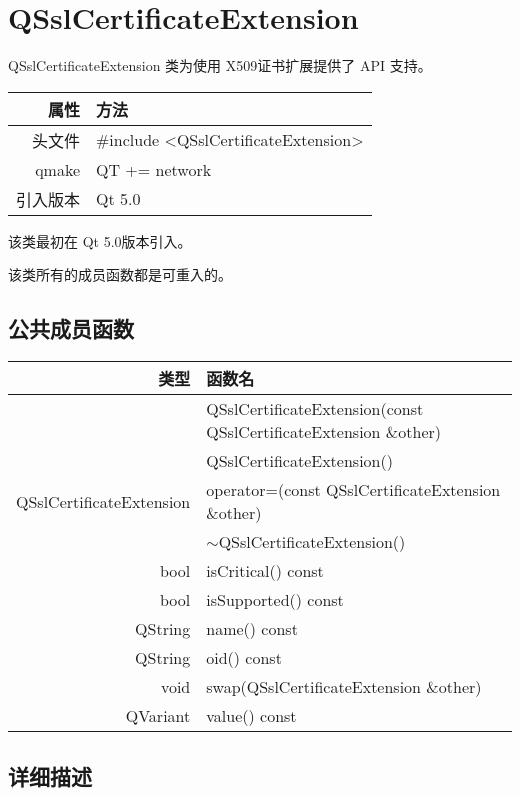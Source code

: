 \chapter{QSslCertificateExtension}

QSslCertificateExtension 类为使用 X509证书扩展提供了 API 支持。

\begin{tabular}{|r|l|}
	\hline
	属性 & 方法 \\
	\hline
	头文件 & \#include <QSslCertificateExtension>\\      
	\hline
	qmake & QT += network\\      
	\hline
	引入版本 &	Qt 5.0 \\ 
	\hline
\end{tabular}

该类最初在 Qt 5.0版本引入。

\begin{notice}
该类所有的成员函数都是可重入的。
\end{notice}

\section{公共成员函数}


\begin{tabular}{|r|m{20em}|}
\hline 
类型 	& 函数名 \\ 
\hline
&QSslCertificateExtension(const QSslCertificateExtension \&other) \\
\hline
&QSslCertificateExtension()\\
\hline
QSslCertificateExtension & 	operator=(const QSslCertificateExtension \&other) \\
\hline
&$\sim$QSslCertificateExtension() \\ 
\hline
bool 	&isCritical() const \\ 
\hline
bool 	&isSupported() const \\ 
\hline
QString &	name() const \\ 
\hline
QString &	oid() const \\ 
\hline
void 	&swap(QSslCertificateExtension \&other) \\ 
\hline
QVariant 	&value() const \\ 
\hline
\end{tabular}




\section{详细描述}

